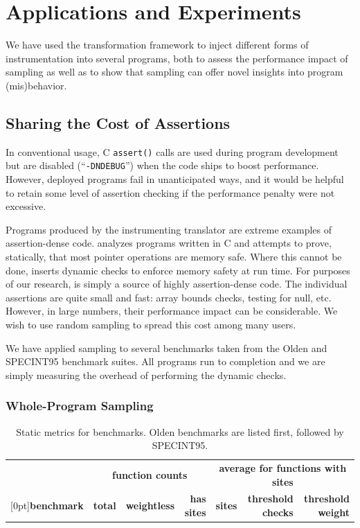 \section{Applications and Experiments}
\label{sec:applications}

We have used the transformation framework to inject different forms of
instrumentation into several programs, both to assess the performance
impact of sampling as well as to show that sampling can offer novel
insights into program (mis)behavior.

\subsection{Sharing the Cost of Assertions}
\label{sec:share}

In conventional usage, C \texttt{assert()} calls are used during
program development but are disabled (``\texttt{-DNDEBUG}'') when the
code ships to boost performance.  However, deployed programs fail in
unanticipated ways, and it would be helpful to retain some level of
assertion checking if the performance penalty were not excessive.

Programs produced by the \CCured instrumenting translator
\cite{POPL_'02*128} are extreme examples of assertion-dense code.
\CCured analyzes programs written in C and attempts to prove,
statically, that most pointer operations are memory safe.  Where this
cannot be done, \CCured inserts dynamic checks to enforce memory
safety at run time.  For purposes of our research, \CCured is simply a
source of highly assertion-dense code.  The individual assertions are
quite small and fast: array bounds checks, testing for null, etc.
However, in large numbers, their performance impact can be
considerable.  We wish to use random sampling to spread this cost
among many users.

We have applied sampling to several benchmarks taken from the Olden
\cite{Carlisle:1996:OPPWDDSDMM} and SPECINT95 \cite{SPEC95} benchmark
suites.  All programs run to completion and we are simply measuring
the overhead of performing the dynamic checks.

\subsubsection{Whole-Program Sampling}
\label{sec:share:whole}

\begin{table}[tb]
  \centering
  \small
  \begin{tabular}{|l|rrr|rrr|}
    \hline
    & \multicolumn{3}{c|}{\textbf{function counts}} & \multicolumn{3}{c|}{\textbf{average for functions with sites}} \\
    \raisebox{1.5ex}[0pt]{\textbf{benchmark}} & \textbf{total} & \textbf{weightless} & \textbf{has sites} & \textbf{sites} & \textbf{threshold checks} & \textbf{threshold weight} \\
    \hline\hline
    
  \end{tabular}
  \caption{Static metrics for \CCured benchmarks.  Olden benchmarks
    are listed first, followed by SPECINT95.}
  \label{tab:share:static}
\end{table}

